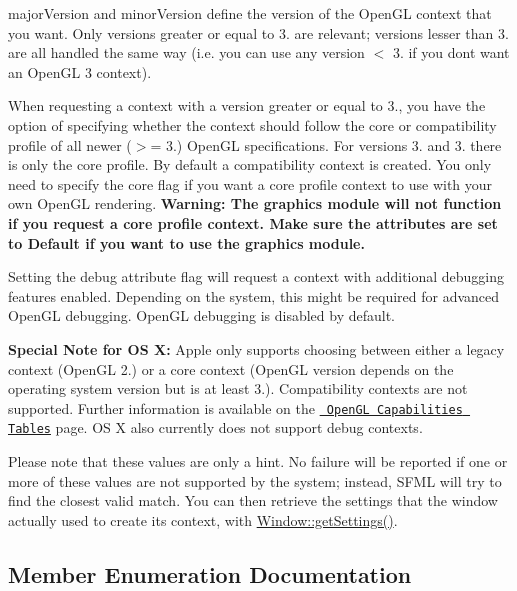 major\+Version and minor\+Version define the version of the Open\+GL context that you want. Only versions greater or equal to 3. are relevant; versions lesser than 3. are all handled the same way (i.\+e. you can use any version $<$ 3. if you don\textquotesingle{}t want an Open\+GL 3 context).

When requesting a context with a version greater or equal to 3., you have the option of specifying whether the context should follow the core or compatibility profile of all newer ($>$= 3.) Open\+GL specifications. For versions 3. and 3. there is only the core profile. By default a compatibility context is created. You only need to specify the core flag if you want a core profile context to use with your own Open\+GL rendering. {\bfseries{Warning\+: The graphics module will not function if you request a core profile context. Make sure the attributes are set to Default if you want to use the graphics module.}}

Setting the debug attribute flag will request a context with additional debugging features enabled. Depending on the system, this might be required for advanced Open\+GL debugging. Open\+GL debugging is disabled by default.

{\bfseries{Special Note for OS X\+:}} Apple only supports choosing between either a legacy context (Open\+GL 2.) or a core context (Open\+GL version depends on the operating system version but is at least 3.). Compatibility contexts are not supported. Further information is available on the 
\href{https://developer.apple.com/opengl/capabilities/index.html}{\texttt{ Open\+GL Capabilities Tables}} page. OS X also currently does not support debug contexts.

Please note that these values are only a hint. No failure will be reported if one or more of these values are not supported by the system; instead, S\+F\+ML will try to find the closest valid match. You can then retrieve the settings that the window actually used to create its context, with \mbox{\hyperlink{classsf_1_1_window_ae5b8065e92bbd0408e1fd8328e80d7d1}{Window\+::get\+Settings()}}. \begin{DoxyVerb}\end{DoxyVerb}
 

\subsection{Member Enumeration Documentation}
\mbox{\label{structsf_1_1_context_settings_af2e91e57e8d26c40afe2ec8efaa32a2c}} 
